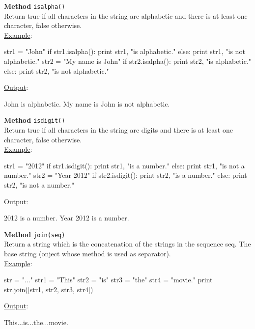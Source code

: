 \noindent
{\bf Method} {\tt isalpha()}\\

\noindent
Return true if all characters in the string are alphabetic and 
there is at least one character, false otherwise.\\

\noindent
\underline{Example}:
\begin{bluecode}
str1 = "John"
if str1.isalpha():
    print str1, "is alphabetic."
else: 
    print str1, "is not alphabetic."
str2 = "My name is John"
if str2.isalpha():
    print str2, "is alphabetic."
else: 
    print str2, "is not alphabetic."
\end{bluecode}
\underline{Output}:
\begin{greencode}
John is alphabetic.
My name is John is not alphabetic.
\end{greencode}
\vspace{4mm}

\noindent
{\bf Method} {\tt isdigit()}\\

\noindent
Return true if all characters in the string are digits and there is at least one character, false otherwise.\\

\noindent
\underline{Example}:
\begin{bluecode}
str1 = "2012"
if str1.isdigit():
    print str1, "is a number."
else: 
    print str1, "is not a number."
str2 = "Year 2012"
if str2.isdigit():
    print str2, "is a number."
else: 
    print str2, "is not a number."
\end{bluecode}
\underline{Output}:
\begin{greencode}
2012 is a number.
Year 2012 is a number.
\end{greencode}
\vspace{4mm}

\noindent
{\bf Method} {\tt join(seq)}\\

\noindent
Return a string which is the concatenation of the strings in the sequence seq. The 
base string (onject whose method is used as separator).\\

\noindent
\underline{Example}:
\begin{bluecode}
str = "..."
str1 = "This"
str2 = "is"
str3 = "the"
str4 = "movie."
print str.join([str1, str2, str3, str4])
\end{bluecode}
\underline{Output}:
\begin{greencode}
This...is...the...movie.
\end{greencode}
\vspace{4mm}


